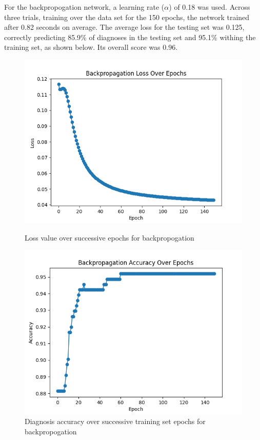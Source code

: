 \documentclass[12pt]{article}
\begin{document}
    For the backpropogation network, a learning rate (\(\alpha\)) of 0.18 was used.  Across three trials, training over the data set for
    the 150 epochs, the network trained after 0.82 seconds on average.  The average loss for the testing set was 0.125, 
    correctly predicting 85.9\% of diagnoses in the testing set and 95.1\% withing the training set, as shown below.
    Its overall score was 0.96.
    \begin{figure}[h]
        \begin{minipage}{0.48\textwidth}
            \centering
            \includegraphics[width=.9\linewidth]{backproplosses.png}
            \caption{Loss value over successive epochs for backpropogation}
        \end{minipage}\hfill
        \begin{minipage}{0.48\textwidth}
            \centering
            \includegraphics[width=.9\linewidth]{backpropaccuracy.png}
            \caption{Diagnosis accuracy over successive training set epochs for backpropogation}
        \end{minipage}
    \end{figure}
\end{document}
